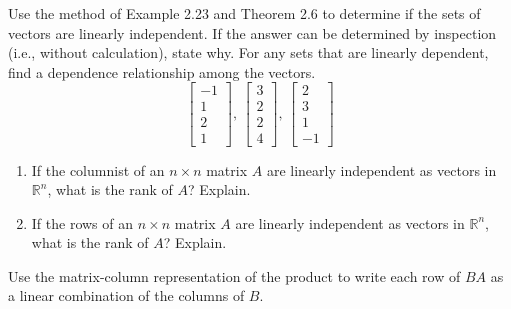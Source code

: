 \documentclass[12pt,letterpaper]{hmcpset}
\begin{document}
\begin{solution}
\vfill
\end{solution}
\newpage

\begin{problem}[2.2.28]

Use the method of Example 2.23 and Theorem 2.6 to determine if the sets of vectors are linearly independent. If the answer can be determined by inspection (i.e., without calculation), state why. For any sets that are linearly dependent, find a dependence relationship among the vectors.$$\begin{bmatrix}
	-1\\
	1\\
	2\\
	1
\end{bmatrix}\text{, }\begin{bmatrix}
	3\\
	2\\
	2\\
	4
\end{bmatrix}\text{, }\begin{bmatrix}
	2\\
	3\\
	1\\
	-1
\end{bmatrix}$$

\end{problem}

\begin{solution}
\vfill
\end{solution}
\newpage

\begin{problem}[2.3.42]

\begin{enumerate}
	\item
		If the columnist of an $n \times n$ matrix $A$ are linearly independent as vectors in $\mathbb{R}^n$, what is the rank of $A$? Explain.
	\item
		If the rows of an $n \times n$ matrix $A$ are linearly independent as vectors in $\mathbb{R}^n$, what is the rank of $A$? Explain.
\end{enumerate}

\end{problem}

\begin{solution}
\vfill
\end{solution}
\newpage

\begin{problem}[3.1.26]

Use the matrix-column representation of the product to write each row of $BA$ as a linear combination of the columns of $B$.

\end{problem}
\end{document}
